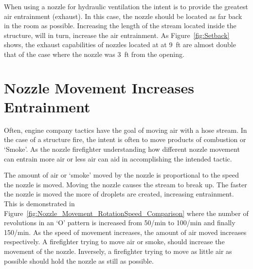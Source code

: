 \documentclass[12pt,oneside]{book}
\begin{document}
When using a nozzle for hydraulic ventilation the intent is to provide the greatest air entrainment (exhaust). In this case, the nozzle should be located as far back in the room as possible. Increasing the length of the stream located inside the structure, will in turn, increase the air entrainment. As Figure~\ref{fig:Setback} shows, the exhaust capabilities of nozzles located at at 9~ft are almost double that of the case where the nozzle was 3~ft from the opening. 

\section{Nozzle Movement Increases Entrainment}
Often, engine company tactics have the goal of moving air with a hose stream. In the case of a structure fire, the intent is often to move products of combustion or `Smoke'. As the nozzle firefighter understanding how different nozzle movement can entrain more air or less air can aid in accomplishing the intended tactic. 

The amount of air or `smoke' moved by the nozzle is proportional to the speed the nozzle is moved. Moving the nozzle causes the stream to break up. The faster the nozzle is moved the more of droplets are created, increasing entrainment. This is demonstrated in Figure~\ref{fig:Nozzle_Movement_RotationSpeed_Comparison} where the number of revolutions in an `O' pattern is increased from 50/min to 100/min and finally 150/min. As the speed of movement increases, the amount of air moved increases respectively. A firefighter trying to move air or smoke, should increase the movement of the nozzle. Inversely, a firefighter trying to move as little air as possible should hold the nozzle as still as possible.  
\end{document}
